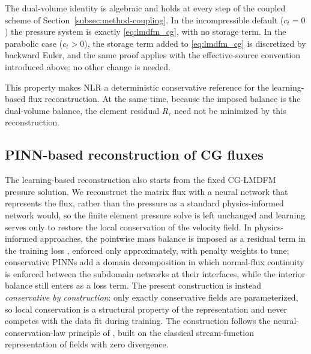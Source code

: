 \documentclass[a4paper,fleqn]{cas-sc}
\begin{document}
The dual-volume identity is algebraic and holds at every step of the coupled
scheme of Section~\ref{subsec:method-coupling}. In the incompressible default
(\(c_t=0\)) the pressure system is exactly \eqref{eq:lmdfm_cg}, with no storage
term. In the parabolic case (\(c_t>0\)), the storage term added to
\eqref{eq:lmdfm_cg} is discretized by backward Euler, and the same proof applies
with the effective-source convention introduced above; no other change is needed.

This property makes NLR a deterministic conservative reference for the
learning-based flux reconstruction. At the same time, because the imposed
balance is the dual-volume balance, the element residual \(R_\tau\) need not be
minimized by this reconstruction.

\subsection{PINN-based reconstruction of CG fluxes}
\label{subsec:pinn-reconstruction}

The learning-based reconstruction also starts from the fixed CG-LMDFM pressure
solution. We reconstruct the matrix flux with a neural network that
represents the flux, rather than the pressure as a standard physics-informed
network would, so the finite element pressure solve is left unchanged and
learning serves only to restore the local conservation of the velocity field.
In physics-informed approaches, the pointwise mass balance is imposed as a
residual term in the training loss \citep{Raissi2019}, enforced only
approximately, with penalty weights to tune; conservative PINNs
\citep{Jagtap2020} add a domain decomposition in which normal-flux continuity
is enforced between the subdomain networks at their interfaces, while the
interior balance still enters as a loss term. The present construction is
instead \emph{conservative by construction}: only exactly conservative fields
are parameterized, so local conservation is a structural property of the
representation and never competes with the data fit during training. The
construction follows the neural-conservation-law principle of
\citet{RichterPowell2022}, built on the classical stream-function
representation of fields with zero divergence.
\end{document}
